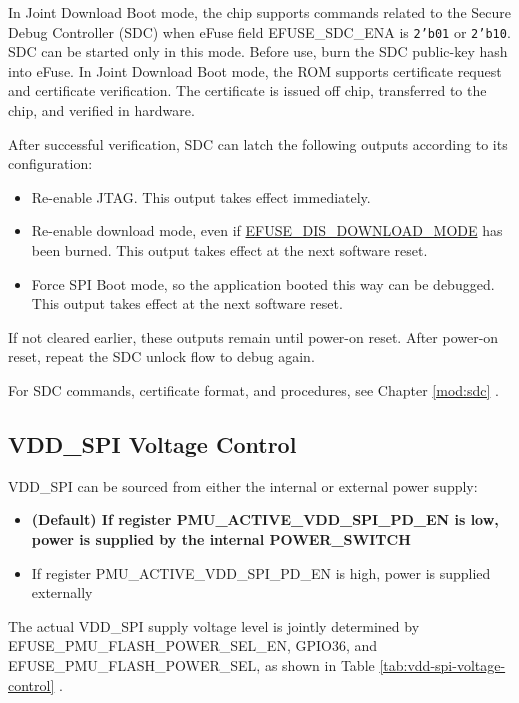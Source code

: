 \documentclass[main\_\_EN.tex]{subfiles}
\begin{document}
In Joint Download Boot mode, the chip supports commands related to the Secure Debug Controller (SDC) when eFuse field EFUSE\_SDC\_ENA is \texttt{2'b01} or \texttt{2'b10}. SDC can be started only in this mode.
Before use, burn the SDC public-key hash into eFuse. In Joint Download Boot mode, the ROM supports certificate request and certificate verification. The certificate is issued off chip, transferred to the chip, and verified in hardware.

After successful verification, SDC can latch the following outputs according to its configuration:

\begin{itemize}
    \item Re-enable JTAG. This output takes effect immediately.
    \item Re-enable download mode, even if \hyperref[fielddesc:EFUSEDISDOWNLOADMODE]{EFUSE\_DIS\_DOWNLOAD\_MODE} has been burned. This output takes effect at the next software reset.
    \item Force SPI Boot mode, so the application booted this way can be debugged. This output takes effect at the next software reset.
\end{itemize}

If not cleared earlier, these outputs remain until power-on reset. After power-on reset, repeat the SDC unlock flow to debug again.

For SDC commands, certificate format, and procedures, see Chapter \ref{mod:sdc} \textit{}.


\subsection{VDD\_SPI Voltage Control}
\label{sec:vdd-spi-voltage}

VDD\_SPI can be sourced from either the internal or external power supply:

\begin{itemize}
    \item \textbf{(Default) If register PMU\_ACTIVE\_VDD\_SPI\_PD\_EN is low, power is supplied by the internal POWER\_SWITCH}
    \item If register PMU\_ACTIVE\_VDD\_SPI\_PD\_EN is high, power is supplied externally
\end{itemize}


The actual VDD\_SPI supply voltage level is jointly determined by EFUSE\_PMU\_FLASH\_POWER\_SEL\_EN, GPIO36, and EFUSE\_PMU\_FLASH\_POWER\_SEL, as shown in Table \ref{tab:vdd-spi-voltage-control} \textit{}.
\end{document}
